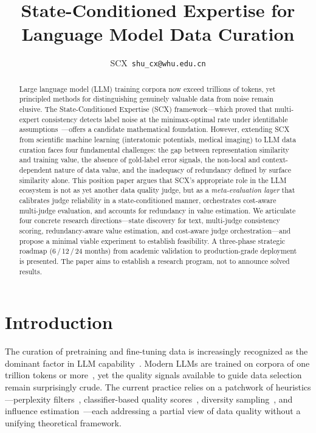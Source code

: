 \documentclass[11pt,twocolumn]{article}
\title{State-Conditioned Expertise for Language Model Data Curation}
\author{SCX\ \texttt{shu_cx@whu.edu.cn}}
\begin{document}
\maketitle

\begin{abstract}
Large language model (LLM) training corpora now exceed trillions of tokens, yet principled methods for distinguishing genuinely valuable data from noise remain elusive. The State-Conditioned Expertise (SCX) framework---which proved that multi-expert consistency detects label noise at the minimax-optimal rate under identifiable assumptions~\cite{scx2026}---offers a candidate mathematical foundation. However, extending SCX from scientific machine learning (interatomic potentials, medical imaging) to LLM data curation faces four fundamental challenges: the gap between representation similarity and training value, the absence of gold-label error signals, the non-local and context-dependent nature of data value, and the inadequacy of redundancy defined by surface similarity alone. This position paper argues that SCX's appropriate role in the LLM ecosystem is not as yet another data quality judge, but as a \textit{meta-evaluation layer} that calibrates judge reliability in a state-conditioned manner, orchestrates cost-aware multi-judge evaluation, and accounts for redundancy in value estimation. We articulate four concrete research directions---state discovery for text, multi-judge consistency scoring, redundancy-aware value estimation, and cost-aware judge orchestration---and propose a minimal viable experiment to establish feasibility. A three-phase strategic roadmap (6\,/\,12\,/\,24 months) from academic validation to production-grade deployment is presented. The paper aims to establish a research program, not to announce solved results.
\end{abstract}

\section{Introduction}

The curation of pretraining and fine-tuning data is increasingly recognized as the dominant factor in LLM capability~\cite{gunasekar2023textbooks,zhou2024web,Brown2020}. Modern LLMs are trained on corpora of one trillion tokens or more~\cite{raffel2020,gao2020pile}, yet the quality signals available to guide data selection remain surprisingly crude. The current practice relies on a patchwork of heuristics---perplexity filters~\cite{wenzek2020quality}, classifier-based quality scores~\cite{penedo2023refinedweb}, diversity sampling~\cite{xie2023dsir}, and influence estimation~\cite{pruthi2020estimating,koh2017influence}---each addressing a partial view of data quality without a unifying theoretical framework.
\end{document}
